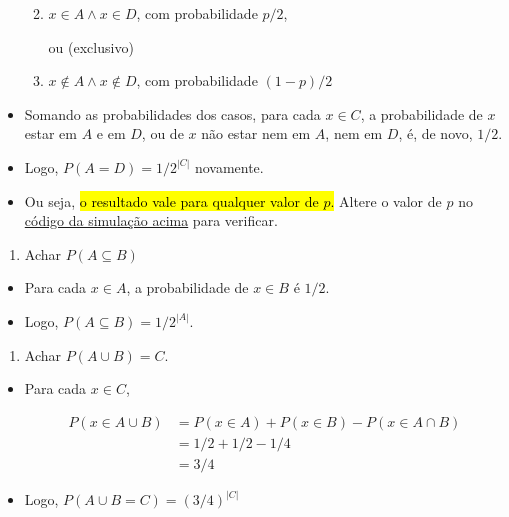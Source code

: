 \documentclass[
  11pt]{report}
\providecommand{\tightlist}{%
  \setlength{\itemsep}{0pt}\setlength{\parskip}{0pt}}
\begin{document}
\begin{itemize}
  \begin{enumerate}
  \def\labelenumi{\arabic{enumi}.}
  \item
    $x \in A \land x \in D$, com probabilidade $p/2$,

    ou (exclusivo)
  \item
    $x \not\in A \land x \not\in D$, com probabilidade $(1 - p)/2$
  \end{enumerate}
\item
  Somando as probabilidades dos casos, para cada $x \in C$, a probabilidade de $x$ estar em $A$ e em $D$, ou de $x$ não estar nem em $A$, nem em $D$, é, de novo, $1/2$.
\item
  Logo, $P(A = D) = 1/ 2^{|C|}$ novamente.
\item
  Ou seja, {\hl{o resultado vale para qualquer valor de $p$.}} Altere o valor de $p$ no \protect\hyperlink{simular-com-p}{código da simulação acima} para verificar.
\end{itemize}

\begin{rmdbox}

\begin{enumerate}
\def\labelenumi{\alph{enumi}.}
\setcounter{enumi}{1}
\tightlist
\item
  Achar $P(A \subseteq B)$
\end{enumerate}

\end{rmdbox}

\begin{itemize}
\item
  Para cada $x \in A$, a probabilidade de $x \in B$ é $1/2$.
\item
  Logo, $P(A \subseteq B) = 1 / 2^{|A|}$.
\end{itemize}

\begin{rmdbox}

\begin{enumerate}
\def\labelenumi{\alph{enumi}.}
\setcounter{enumi}{2}
\tightlist
\item
  Achar $P(A \cup B) = C$.
\end{enumerate}

\end{rmdbox}

\begin{itemize}
\item
  Para cada $x \in C$,

  \[
  \begin{aligned}
  P(x \in A \cup B) 
  &= P(x \in A) + P(x \in B) - P(x \in A \cap B) \\
  &= 1/2 + 1/2 - 1/4 \\
  &= 3/4
  \end{aligned}
  \]
\item
  Logo, $P(A \cup B = C) = (3/4)^{|C|}$
\end{itemize}
\end{document}
